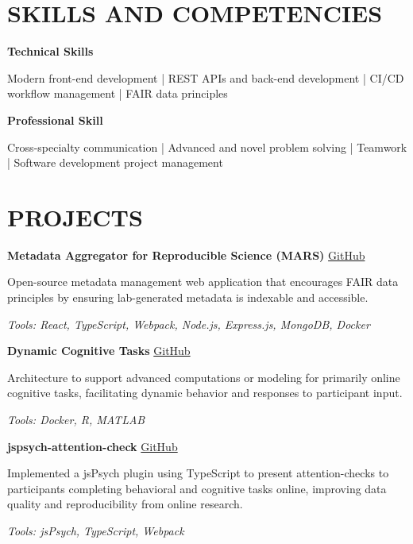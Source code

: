 \documentclass{article}
\begin{document}
  \section*{\centering\uppercase{Skills and Competencies}}

  {\large\textbf{Technical Skills}}

  Modern front-end development | REST APIs and back-end development | CI/CD workflow management | FAIR data principles

  \medbreak

  {\large\textbf{Professional Skill}}

  Cross-specialty communication | Advanced and novel problem solving | Teamwork | Software development project management

  \section*{\centering\uppercase{Projects}}

  \textbf{Metadata Aggregator for Reproducible Science (MARS)} \hfill \href{https://github.com/Brain-Development-and-Disorders-Lab/mars}{\color{blue}GitHub}

  Open-source metadata management web application that encourages FAIR data principles by ensuring lab-generated metadata is indexable and accessible.

  \textit{Tools: React, TypeScript, Webpack, Node.js, Express.js, MongoDB, Docker}

  \medbreak

  \textbf{Dynamic Cognitive Tasks} \hfill \href{https://github.com/Brain-Development-and-Disorders-Lab/mars}{\color{blue}GitHub}

  Architecture to support advanced computations or modeling for primarily online cognitive tasks, facilitating dynamic behavior and responses to participant input.

  \textit{Tools: Docker, R, MATLAB}

  \medbreak

  \textbf{jspsych-attention-check} \hfill \href{https://github.com/Brain-Development-and-Disorders-Lab/jspsych-attention-check}{\color{blue}GitHub}

  Implemented a jsPsych plugin using TypeScript to present attention-checks to participants completing behavioral and cognitive tasks online, improving data quality and reproducibility from online research.

  \textit{Tools: jsPsych, TypeScript, Webpack}
\end{document}
